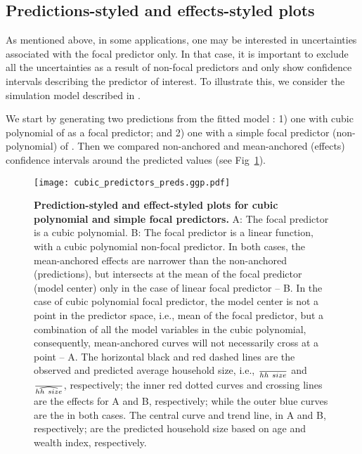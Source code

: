 \subsection{Predictions-styled and effects-styled plots}

As mentioned above, in some applications, one may be interested in uncertainties associated with the focal predictor only. In that case, it is important to exclude all the uncertainties as a result of non-focal predictors and only show confidence intervals describing the predictor of interest. To illustrate this, we consider the simulation model described in . 

We start by generating two predictions from the fitted model : 1) one with cubic polynomial of  as a focal predictor; and 2) one with a simple focal predictor (non-polynomial) of . Then we compared non-anchored and mean-anchored (effects) confidence intervals around the predicted values (see Fig~\ref{fig:pred_cubic_plots}).

\begin{figure}[h]
\begin{center}
\texttt{[image: cubic\_predictors\_preds.ggp.pdf]}
\end{center}
\caption{{\bf Prediction-styled and effect-styled plots for cubic polynomial and simple focal predictors.} A: The focal predictor is a cubic polynomial. B: The focal predictor is a linear function, with a cubic polynomial non-focal predictor. In both cases, the mean-anchored effects are narrower than the non-anchored (predictions), but intersects at the mean of the focal predictor (model center) only in the case of linear focal predictor -- B. In the case of cubic polynomial focal predictor, the model center is not a point in the predictor space, i.e., mean of the focal predictor, but a combination of all the model variables in the cubic polynomial, consequently, mean-anchored curves will not necessarily cross at a point -- A. The horizontal black and red dashed lines are the observed and predicted average household size, i.e., $\over{hh~size}$ and $\over{\widehat{hh~size}}$, respectively; the inner red dotted curves and crossing lines are the effects for A and B, respectively; while the outer blue curves are the  in both cases. The central curve and trend line, in A and B, respectively; are the predicted household size based on age and wealth index, respectively. }
\label{fig:pred_cubic_plots}
\end{figure}

